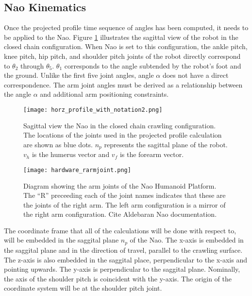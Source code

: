\subsection{Nao Kinematics}
Once the projected profile time sequence of angles has been computed, it needs to be applied to the Nao.
Figure \ref{fig:nao_pp_view1} illustrates the sagittal view of the robot in the closed chain configuration.
When Nao is set to this configuration, the ankle pitch, knee pitch, hip pitch, and shoulder pitch joints 
of the robot directly correspond to $\theta_2$ through $\theta_5$. $\theta_1$ corresponds to the angle
subtended by the robot's foot and the ground. Unlike the first five joint angles, angle $\alpha$ does not have a
direct correspondence. The arm joint angles must be derived as a relationship between the angle $\alpha$ and additional
arm positioning constraints.

\begin{figure}
	\texttt{[image: horz\_profile\_with\_notation2.png]}
  	\caption{Sagittal view the Nao in the closed chain crawling configuration. 
  					 The locations of the joints used in the projected profile calculation are shown as blue dots. 
  					 $n_p$ represents the sagittal plane of the robot.
  					 $v_h$ is the humerus vector and $v_f$ is the forearm vector.
  					}
  	\label{fig:nao_pp_view1}
\end{figure}

\begin{figure}
	\texttt{[image: hardware\_rarmjoint.png]}
  	\caption{Diagram showing the arm joints of the Nao Humanoid Platform.
  					 The ``R'' preceeding each of the joint names indicates that these
  					 are the joints of the right arm. The left arm configuration is a mirror
  					 of the right arm configuration. Cite Aldebaran Nao documentation.
  				  }
  	\label{fig:nao_rarm_hardware1}
\end{figure}

The coordinate frame that all of the calculations will be done with respect to, will be embedded in the
saggital plane $n_p$ of the Nao. The x-axis is embedded in the saggital plane and in the direction of travel, parallel to the crawling surface. The z-axis is also embedded in the saggital place, perpendicular to the x-axis
and pointing upwards.
The y-axis is perpendicular to the saggital plane. Nominally, the axis of the shoulder pitch is coincident
with the y-axis. The origin of the coordinate system will be at the shoulder pitch joint.

